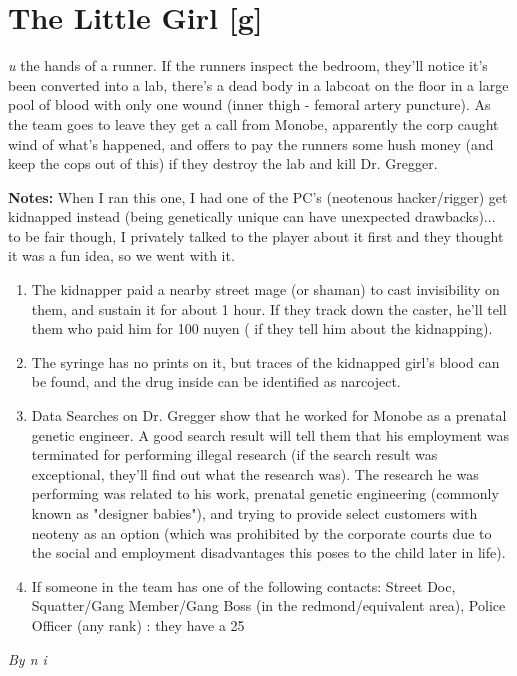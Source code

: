 \documentclass[letterpaper,twocolumn,10.5pt]{article}
\newenvironment{scenario}[6]
	{
		\section{#1 {\small[#2]}}
		\textit{#3}
		\def\TMPSCENARIO{#4 #5}
	}
	{\small\textit{By \TMPSCENARIO}}
\newcommand{\notes}{\textbf{Notes: }}
\begin{document}
\begin{scenario}{The Little Girl}
gun in the hands of a runner. If the runners inspect the bedroom, they'll notice it's been converted into a lab, there's a dead body in a labcoat on the floor in a large pool of blood with only one wound (inner thigh - femoral artery puncture). As the team goes to leave they get a call from Monobe, apparently the corp caught wind of what's happened, and offers to pay the runners some hush money (and keep the cops out of this) if they destroy the lab and kill Dr. Gregger.

\notes When I ran this one, I had one of the PC's (neotenous hacker/rigger) get kidnapped instead (being genetically unique can have unexpected drawbacks)... to be fair though, I privately talked to the player about it first and they thought it was a fun idea, so we went with it.

\begin{enumerate}

\item The kidnapper paid a nearby street mage (or shaman) to cast invisibility on them, and sustain it for about 1 hour. If they track down the caster, he'll tell them who paid him for 100 nuyen ( if they tell him about the kidnapping).

\item The syringe has no prints on it, but traces of the kidnapped girl's blood can be found, and the drug inside can be identified as narcoject.

\item Data Searches on Dr. Gregger show that he worked for Monobe as a prenatal genetic engineer. A good search result will tell them that his employment was terminated for performing illegal research (if the search result was exceptional, they'll find out what the research was). The research he was performing was related to his work, prenatal genetic engineering (commonly known as "designer babies"), and trying to provide select customers with neoteny as an option (which was prohibited by the corporate courts due to the social and employment disadvantages this poses to the child later in life).

\item If someone in the team has one of the following contacts: Street Doc, Squatter/Gang Member/Gang Boss (in the redmond/equivalent area), Police Officer (any rank) : they have a 25%


\end{enumerate}
\end{scenario}
\end{document}
